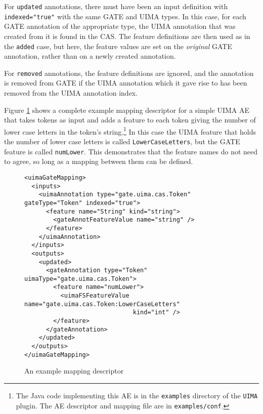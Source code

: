 For \texttt{updated} annotations, there must have been an input definition with
\texttt{indexed="true"} with the same GATE and UIMA types.  In this case, for
each GATE annotation of the appropriate type, the UIMA annotation that was
created from it is found in the CAS.  The feature definitions are then used as
in the \texttt{added} case, but here, the feature values are set on the
\emph{original} GATE annotation, rather than on a newly created annotation.

For \texttt{removed} annotations, the feature definitions are ignored, and the
annotation is removed from GATE if the UIMA annotation which it gave rise to
has been removed from the UIMA annotation index.


Figure \ref{fig:UIMAInGATE:example} shows a complete example mapping descriptor
for a simple UIMA AE that takes tokens as input and adds a feature to each
token giving the number of lower case letters in the token's
string.\footnote{The Java code implementing this AE is in the \texttt{examples}
directory of the \texttt{UIMA} plugin.  The AE descriptor and mapping file are
in \texttt{examples/conf}.}  In this case the UIMA feature that holds the
number of lower case letters is called \texttt{LowerCaseLetters}, but the GATE
feature is called \texttt{numLower}.  This demonstrates that the feature names
do not need to agree, so long as a mapping between them can be defined.
%
\begin{figure}
\begin{small}
\begin{verbatim}
<uimaGateMapping>
  <inputs>
    <uimaAnnotation type="gate.uima.cas.Token" gateType="Token" indexed="true">
      <feature name="String" kind="string">
        <gateAnnotFeatureValue name="string" />
      </feature>
    </uimaAnnotation>
  </inputs>
  <outputs>
    <updated>
      <gateAnnotation type="Token" uimaType="gate.uima.cas.Token">
        <feature name="numLower">
          <uimaFSFeatureValue name="gate.uima.cas.Token:LowerCaseLetters"
                              kind="int" />
        </feature>
      </gateAnnotation>
    </updated>
  </outputs>
</uimaGateMapping>
\end{verbatim}
\end{small}
\caption{An example mapping descriptor}
\label{fig:UIMAInGATE:example}
\end{figure}

